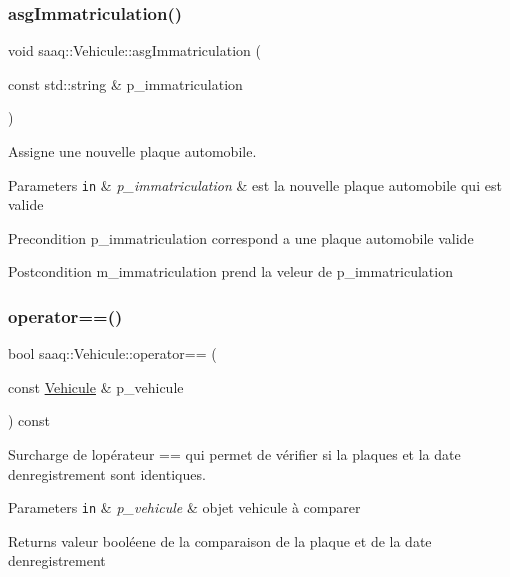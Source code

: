 \subsubsection{\texorpdfstring{asg\+Immatriculation()}{asgImmatriculation()}}
{\footnotesize\ttfamily void saaq\+::\+Vehicule\+::asg\+Immatriculation (\begin{DoxyParamCaption}\item[{const std\+::string \&}]{p\+\_\+immatriculation }\end{DoxyParamCaption})\hspace{0.3cm}{\ttfamily [protected]}}



Assigne une nouvelle plaque automobile. 


\begin{DoxyParams}[1]{Parameters}
\mbox{\tt in}  & {\em p\+\_\+immatriculation} & est la nouvelle plaque automobile qui est valide \\
\hline
\end{DoxyParams}
\begin{DoxyPrecond}{Precondition}
p\+\_\+immatriculation correspond a une plaque automobile valide 
\end{DoxyPrecond}
\begin{DoxyPostcond}{Postcondition}
m\+\_\+immatriculation prend la veleur de p\+\_\+immatriculation 
\end{DoxyPostcond}
\mbox{\label{classsaaq_1_1Vehicule_a9dd4c5e7c74ebabd5f4ce651d21d79fc}} 
\subsubsection{\texorpdfstring{operator==()}{operator==()}}
{\footnotesize\ttfamily bool saaq\+::\+Vehicule\+::operator== (\begin{DoxyParamCaption}\item[{const \hyperlink{classsaaq_1_1Vehicule}{Vehicule} \&}]{p\+\_\+vehicule }\end{DoxyParamCaption}) const}



Surcharge de l\textquotesingle{}opérateur == qui permet de vérifier si la plaques et la date d\textquotesingle{}enregistrement sont identiques. 


\begin{DoxyParams}[1]{Parameters}
\mbox{\tt in}  & {\em p\+\_\+vehicule} & objet vehicule à comparer \\
\hline
\end{DoxyParams}
\begin{DoxyReturn}{Returns}
valeur booléene de la comparaison de la plaque et de la date d\textquotesingle{}enregistrement 
\end{DoxyReturn}
\mbox{\label{classsaaq_1_1Vehicule_a650c5f764375e344e268391a5c3cf8b3}} 
